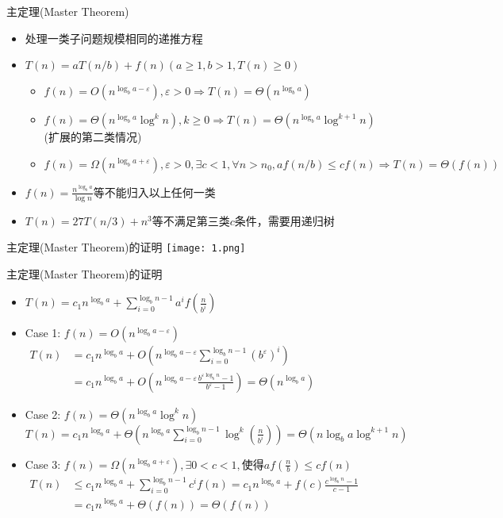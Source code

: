 \documentclass{ctexbeamer}
\begin{document}
    \begin{frame}{主定理(Master Theorem)}
    \begin{itemize}
        \setlength{\itemsep}{0.8em}
        \item 处理一类子问题规模相同的递推方程
        \item $T(n)=aT(n/b)+f(n)  (a\geq1,b>1, T(n)\geq0)$
        \begin{itemize}
        \setlength{\itemsep}{0.5em}
        \item $f(n)=O(n^{\log_ba−\varepsilon}),\varepsilon>0 \Rightarrow T(n)=\Theta(n^{\log_ba})$
        \item $f(n)=\Theta(n^{\log_ba}\log^k n),k\geq 0\Rightarrow T(n)=\Theta(n^{\log_b⁡a}\log^{k+1}n)$\\(扩展的第二类情况)
        \item $f(n)=\Omega(n^{\log_ba+\varepsilon}),\varepsilon>0,\exists c<1,\forall n>n_0,af(n/b)\leq cf(n)\Rightarrow T(n)=\Theta(f(n))$
        \end{itemize}
        \item $f(n)=\frac{n^{\log_ba}}{\log n}$等不能归入以上任何一类
        \item $T(n)=27T(n/3)+n^3$等不满足第三类$c$条件，需要用递归树
    \end{itemize}
    \end{frame}

    \begin{frame}{主定理(Master Theorem)的证明}
    \texttt{[image: 1.png]}
    \end{frame}

    \begin{frame}{主定理(Master Theorem)的证明}
    \begin{itemize}
    \item<+-> $T(n)=c_1n^{\log_ba}+\sum\limits_{i=0}^{\log_bn-1}a^if(\frac{n}{b^i})$
    \item<+-> Case 1: $f(n)=O(n^{\log_ba-\varepsilon})$\\
    $\begin{aligned}T(n)&=c_1n^{\log_ba}+O(n^{\log_ba-\varepsilon}\sum\limits_{i=0}^{\log_bn-1}(b^\varepsilon)^i)\\&=c_1n^{\log_ba}+O(n^{\log_ba-\varepsilon}\frac{b^{\varepsilon\log_bn}-1}{b^\varepsilon-1})=\Theta(n^{\log_ba})\end{aligned}$
    \item<+-> Case 2: $f(n)=\Theta(n^{\log_ba}\log^k n)$\\
    $T(n)=c_1n^{\log_ba}\!+\!\Theta(n^{\log_ba}\!\sum\limits_{i=0}^{\log_bn-1}\log^k(\frac{n}{b^i}))\!=\Theta(n\log_ba\!\log^{k+1}n)$
    \item<+-> Case 3: $f(n)=\Omega(n^{\log_ba+\varepsilon}),\exists 0<c<1,\text{使得}af(\frac{n}{b})\leq cf(n)$\\
    $\begin{aligned}T(n)&\leq c_1n^{\log_ba} +\sum\limits_{i=0}^{\log_bn-1}c^if(n)=c_1n^{\log_ba}+f(c)\frac{c^{\log_bn}-1}{c-1}\\&=c_1n^{\log_ba}+\Theta(f(n))=\Theta(f(n))\end{aligned}$
    \end{itemize}
    \end{frame}
\end{document}
